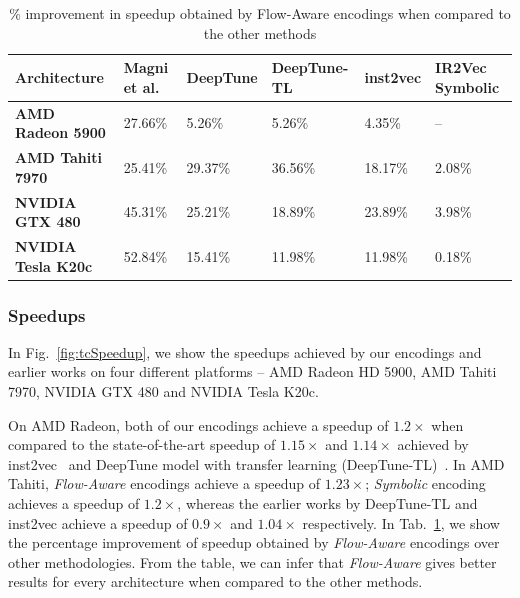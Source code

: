 \begin{table}[h]
\centering
  \caption{\% improvement in speedup obtained by Flow-Aware encodings when compared to the other methods}
  \label{tab:predictionSpeedup-tc}    \small
  \begin{tabular}{p{2.5cm}p{1.9cm}p{1.6cm}p{1.5cm}p{2.2cm}p{1.5cm}}
    \hline
    \textbf{Architecture} & \textbf{Magni et al. \cite{o2013portable-grewe}} & \textbf{DeepTune \cite{cummins2017end2end}} & \textbf{DeepTune-TL \cite{cummins2017end2end}} & \textbf{inst2vec \cite{ncc}}\footnotemark  & \textbf{IR2Vec  Symbolic}\\
    \hline
    \textbf{AMD Radeon 5900} & 27.66\% & 5.26\% & 5.26\% & 4.35\% & -- \\
    \textbf{AMD Tahiti 7970} & 25.41\% & 29.37\% & 36.56\% & 18.17\% & 2.08\% \\
    \textbf{NVIDIA GTX 480} & 45.31\% & 25.21\% & 18.89\% & 23.89\% & 3.98\%\\
    \textbf{NVIDIA Tesla K20c} & 52.84\% & 15.41\% & 11.98\% & 11.98\% & 0.18\%\\
\hline
\end{tabular}
\end{table}

\subsubsection{Speedups}
In Fig.~\ref{fig:tcSpeedup}, we show the speedups achieved by our encodings and earlier works on four different platforms -- AMD Radeon HD 5900, AMD Tahiti 7970, NVIDIA GTX 480 and NVIDIA Tesla K20c. 

On AMD Radeon, both of our encodings achieve a speedup of $ 1.2\times$ when compared to the state-of-the-art speedup of $ 1.15\times$ and $ 1.14\times$ achieved by inst2vec~\cite{ncc} and DeepTune model with transfer learning (DeepTune-TL)~\cite{cummins2017end2end}.
In AMD Tahiti, \textit{Flow-Aware} encodings achieve a speedup of $ 1.23\times$; \textit{Symbolic} encoding achieves a speedup of $ 1.2\times$, whereas the earlier works by DeepTune-TL and inst2vec achieve a speedup of $ 0.9\times$ and $ 1.04\times$ respectively. In Tab.~\ref{tab:predictionSpeedup-tc}, we show the percentage improvement of speedup obtained by \textit{Flow-Aware} encodings over other methodologies. From the table, we can infer that \textit{Flow-Aware} gives better results for every architecture when compared to the other methods. 

